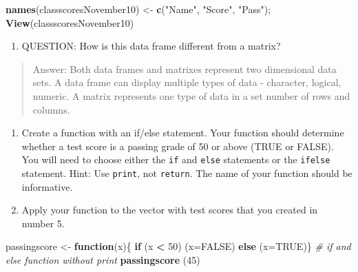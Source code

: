 \documentclass[]{article}
\newenvironment{Shaded}{\begin{snugshade}}{\end{snugshade}}
\newcommand{\CommentTok}[1]{\textcolor[rgb]{0.56,0.35,0.01}{\textit{#1}}}
\newcommand{\ControlFlowTok}[1]{\textcolor[rgb]{0.13,0.29,0.53}{\textbf{#1}}}
\newcommand{\DataTypeTok}[1]{\textcolor[rgb]{0.13,0.29,0.53}{#1}}
\newcommand{\DecValTok}[1]{\textcolor[rgb]{0.00,0.00,0.81}{#1}}
\newcommand{\KeywordTok}[1]{\textcolor[rgb]{0.13,0.29,0.53}{\textbf{#1}}}
\newcommand{\NormalTok}[1]{#1}
\newcommand{\OperatorTok}[1]{\textcolor[rgb]{0.81,0.36,0.00}{\textbf{#1}}}
\newcommand{\OtherTok}[1]{\textcolor[rgb]{0.56,0.35,0.01}{#1}}
\newcommand{\StringTok}[1]{\textcolor[rgb]{0.31,0.60,0.02}{#1}}
\providecommand{\tightlist}{%
  \setlength{\itemsep}{0pt}\setlength{\parskip}{0pt}}
\begin{document}
\begin{Shaded}
\begin{Highlighting}[]
\KeywordTok{names}\NormalTok{(classscoresNovember10) <-}\StringTok{ }\KeywordTok{c}\NormalTok{(}\StringTok{"Name"}\NormalTok{, }\StringTok{"Score"}\NormalTok{, }\StringTok{"Pass"}\NormalTok{); }\KeywordTok{View}\NormalTok{(classscoresNovember10)}
\end{Highlighting}
\end{Shaded}

\begin{enumerate}
\def\labelenumi{\arabic{enumi}.}
\setcounter{enumi}{8}
\tightlist
\item
  QUESTION: How is this data frame different from a matrix?
\end{enumerate}

\begin{quote}
Answer: Both data frames and matrixes represent two dimensional data
sets. A data frame can display multiple types of data - character,
logical, numeric. A matrix represents one type of data in a set number
of rows and columns.
\end{quote}

\begin{enumerate}
\def\labelenumi{\arabic{enumi}.}
\setcounter{enumi}{9}
\item
  Create a function with an if/else statement. Your function should
  determine whether a test score is a passing grade of 50 or above (TRUE
  or FALSE). You will need to choose either the \texttt{if} and
  \texttt{else} statements or the \texttt{ifelse} statement. Hint: Use
  \texttt{print}, not \texttt{return}. The name of your function should
  be informative.
\item
  Apply your function to the vector with test scores that you created in
  number 5.
\end{enumerate}

\begin{Shaded}
\begin{Highlighting}[]
\NormalTok{passingscore <-}\StringTok{ }\ControlFlowTok{function}\NormalTok{(x)\{}
  \ControlFlowTok{if}\NormalTok{ (x }\OperatorTok{<}\StringTok{ }\DecValTok{50}\NormalTok{) (}\DataTypeTok{x=}\OtherTok{FALSE}\NormalTok{) }\ControlFlowTok{else}\NormalTok{ (}\DataTypeTok{x=}\OtherTok{TRUE}\NormalTok{)\} }\CommentTok{# if and else function without print }
\KeywordTok{passingscore}\NormalTok{ (}\DecValTok{45}\NormalTok{) }
\end{Highlighting}
\end{Shaded}
\end{document}
